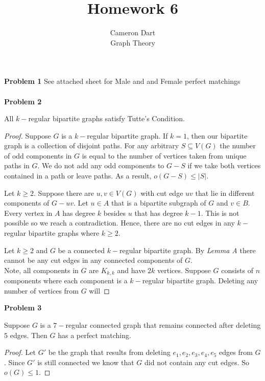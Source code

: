 \documentclass{article}
\newenvironment{lemma}[2][Lemma]{\begin{trivlist}
\item[\hskip \labelsep {\bfseries #1}\hskip \labelsep {\bfseries #2.}]}{\end{trivlist}}
\newenvironment{claim}[2][Claim]{\begin{trivlist}
		\item[\hskip \labelsep {\bfseries #1}\hskip \labelsep {\bfseries #2}]}{\end{trivlist}}
\begin{document}
\title{Homework 6} 
\author{Cameron Dart\\ Graph Theory} 

\maketitle

\noindent \textbf{Problem 1}
See attached sheet for Male and and Female perfect matchings\\ \\

\noindent \textbf{Problem 2}
\begin{claim}{}
	All $k-$regular bipartite graphs satisfy Tutte's Condition.\\
\end{claim}
\begin{proof}
Suppose $G$ is a $k-$regular bipartite graph. If $k = 1$, then our bipartite graph is a collection of disjoint paths. For any arbitrary $S \subseteq V(G)$ the number of odd components in $G$ is equal to the number of vertices taken from unique paths in $G$. We do not add any odd components to $G - S$ if we take both vertices contained in a path or leave paths. As a result, $o(G - S) \leq |S|$.
\begin{lemma}A Let $k \geq 2$. Suppose there are $u,v \in V(G)$ with cut edge $uv$ that lie in different components of $G - uv$.  Let $u \in A$ that is a bipartite subgraph of $G$ and $v \in B$. Every vertex in $A$ has degree $k$ besides $u$ that has degree $k - 1$. This is not possible so we reach a contradiction. Hence, there are no cut edges in any $k-$regular bipartite graphs where $k \geq 2$. 
\end{lemma}
Let $k \geq 2$ and $G$ be a connected $k-$regular bipartite graph. By \textit{Lemma A} there cannot be any cut edges in any connected components of $G$.\\
Note, all components in $G$ are $K_{k,k}$ and have $2k$ vertices.
Suppose $G$ consists of $n$ components where each component is a $k-$regular bipartite graph. Deleting any number of vertices from $G$ will  
\end{proof}

\noindent \textbf{Problem 3}
\begin{claim}{}
Suppose $G$ is a $7-$regular connected graph that remains connected after deleting $5$ edges. Then $G$ has a perfect matching.
\end{claim}
\begin{proof}
Let $G'$ be the graph that results from deleting $e_1,e_2,e_3,e_4,e_5$ edges from $G$. Since $G'$ is still connected we know that $G$ did not contain any cut edges. So $o(G) \leq 1$.
\end{proof}
\end{document}
